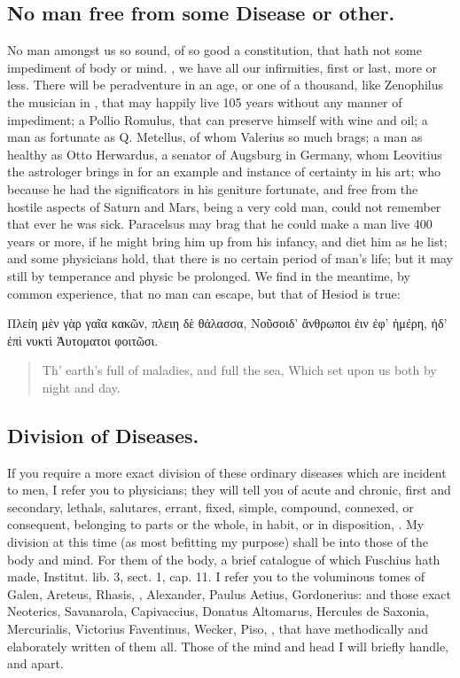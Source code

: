 {\subsection{No man free from some Disease or other.}
No man amongst us so sound, of so good a constitution, that hath not some impediment of body or
mind. , we have all our infirmities, first or
last, more or less. There will be peradventure in an age, or one of a
thousand, like Zenophilus the musician in \Pliny{}, that may happily
live 105 years without any manner of impediment; a Pollio Romulus, that
can preserve himself with wine and oil; a man as fortunate as Q.
Metellus, of whom Valerius so much brags; a man as healthy as Otto
Herwardus, a senator of Augsburg in Germany, whom Leovitius the
astrologer brings in for an example and instance of certainty in his
art; who because he had the significators in his geniture fortunate,
and free from the hostile aspects of Saturn and Mars, being a very cold
man, could not remember that ever he was sick. Paracelsus may
brag that he could make a man live 400 years or more, if he might bring
him up from his infancy, and diet him as he list; and some physicians
hold, that there is no certain period of man's life; but it may still
by temperance and physic be prolonged. We find in the meantime, by
common experience, that no man can escape, but that of Hesiod is
true:
%
\begin{greek}
\begin{displayquote}%
Πλείη μὲν γὰρ γαῖα κακῶν, πλειη δὲ θάλασσα,
Νοῦσοιδ' ἄνθρωποι ἐιν ἐφ' ἡμέρη, ἠδ' ἐπὶ νυκτὶ
Ἁυτοματοι φοιτῶσι.%
\end{displayquote}%
\end{greek}
\translationrule%
\begin{quote}%
Th' earth's full of maladies, and full the sea,
Which set upon us both by night and day.
\end{quote}%

\subsection{Division of Diseases.}
If you require a more exact division of these
ordinary diseases which are incident to men, I refer you to physicians;
they will tell you of acute and chronic, first and secondary,
lethals, salutares, errant, fixed, simple, compound, connexed, or
consequent, belonging to parts or the whole, in habit, or in
disposition, \etc{}. My division at this time (as most befitting my
purpose) shall be into those of the body and mind. For them of the
body, a brief catalogue of which Fuschius hath made, Institut. lib. 3,
sect. 1, cap. 11. I refer you to the voluminous tomes of Galen,
Areteus, Rhasis, \Avicenna{}, Alexander, Paulus Aetius, Gordonerius: and
those exact Neoterics, Savanarola, Capivaccius, Donatus Altomarus,
Hercules de Saxonia, Mercurialis, Victorius Faventinus, Wecker, Piso,
\etc{}, that have methodically and elaborately written of them all. Those
of the mind and head I will briefly handle, and apart.

}
